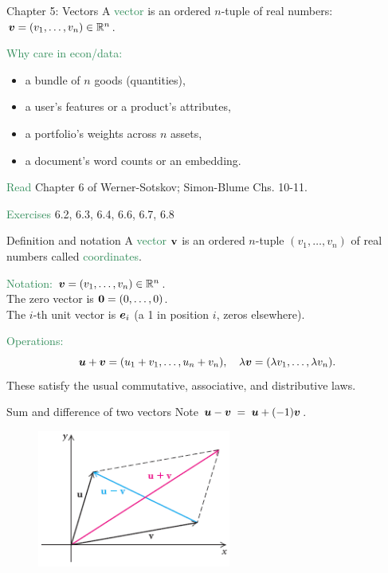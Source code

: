 \documentclass[11pt,aspectratio=169]{beamer}
\begin{document}

\begin{frame}{Chapter 5: Vectors}
A \textcolor{SeaGreen}{vector} is an ordered $n$-tuple of real numbers: $\boldsymbol v=(v_1,\ldots,v_n)\in\mathbb{R}^n$.
\bigskip

\textcolor{SeaGreen}{Why care in econ/data:}
\begin{itemize}
\item a bundle of $n$ goods (quantities),
\item a user's features or a product's attributes,
\item a portfolio's weights across $n$ assets,
\item a document's word counts or an embedding.
\end{itemize}
\bigskip

\textcolor{SeaGreen}{Read} Chapter 6 of Werner-Sotskov; Simon-Blume Chs. 10-11. 
\bigskip

\textcolor{SeaGreen}{Exercises} 6.2, 6.3, 6.4, 6.6, 6.7, 6.8
\end{frame}

\begin{frame}{Definition and notation}
A \textcolor{SeaGreen}{vector} ${\bf v}$ is an ordered $n$-tuple $(v_1,\dots,v_n)$ of real numbers called \textcolor{SeaGreen}{coordinates}.
\bigskip

\textcolor{SeaGreen}{Notation:} $\boldsymbol v=(v_1,\ldots,v_n)\in\mathbb{R}^n$.\\ \quad\quad\quad\;\quad The zero vector is $\boldsymbol 0=(0,\ldots,0)$.\\ 
\quad\quad\quad\;\quad The $i$-th unit vector is $\boldsymbol e_i$ (a 1 in position $i$, zeros elsewhere).
\bigskip

\textcolor{SeaGreen}{Operations:}
\[
\boldsymbol u+\boldsymbol v=(u_1+v_1,\ldots,u_n+v_n),\quad
\lambda\boldsymbol v=(\lambda v_1,\ldots,\lambda v_n).
\]
These satisfy the usual commutative, associative, and distributive laws.\\[4mm]
\end{frame}

\begin{frame}{Sum and difference of two vectors}
Note $\boldsymbol u-\boldsymbol v\;=\;\boldsymbol u+ (-1)\boldsymbol v$.
\begin{figure}
\includegraphics[width=2.5in]{img/sum}
\end{figure}
\end{frame}
\end{document}
